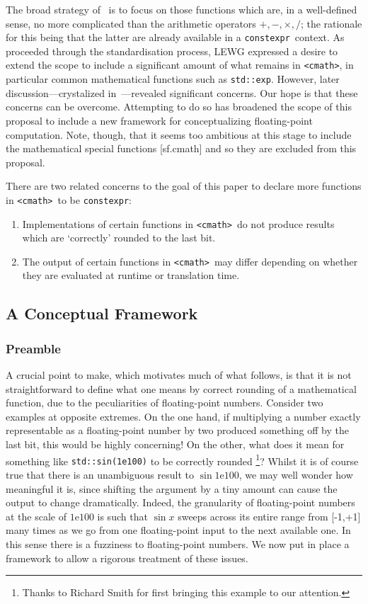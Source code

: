 \documentclass[prd,twocolumn,amsmath,amssymb,nofootinbib,eqsecnum]{revtex4-1}
\newcommand{\constexpr}{\code{constexpr}\xspace}
\newcommand{\code}[1]{{\tt #1}}
\newcommand{\header}[1]{{\tt <#1>}}
\newcommand{\cmath}{\header{cmath}}
\newcommand{\Operators}{\ensuremath{+,-,\times,/}}
\begin{document}
The broad strategy of~\cite{Rosten-constexpr} is to focus on those functions which are, in a well-defined sense, no more complicated than the arithmetic operators \Operators; the rationale for this being that the latter are already available in a \constexpr\ context.
As~\cite{Rosten-constexpr} proceeded through the standardisation process, LEWG expressed a desire 
to extend the scope to include a significant amount of what remains in \cmath, in particular common mathematical functions such as \code{std::exp}. However, later discussion---crystalized in~\cite{Timmons-Less}---revealed significant concerns. Our hope is that these concerns can be overcome. Attempting to do so has broadened the scope of this proposal to include a new framework for conceptualizing floating-point computation.
Note, though, that it seems too ambitious at this stage to include the mathematical special functions [sf.cmath] and so they are excluded from this proposal.

There are two related concerns to the goal of this paper to declare more functions in \cmath\ to be \constexpr:
\begin{enumerate}
	\item Implementations of certain functions in \cmath\ do not produce results which are `correctly' rounded to the last bit.
	
	\item The output of certain functions in \cmath\ may differ depending on whether they are evaluated at runtime or translation time.
\end{enumerate}

\subsection{A Conceptual Framework}

\subsubsection{Preamble}

A crucial point to make, which motivates much of what follows, is that it is not straightforward to define what one means by correct rounding of a mathematical function, due to the peculiarities of floating-point numbers. Consider two examples at opposite extremes. On the one hand, if multiplying a number exactly representable as a floating-point number by two produced something off by the last bit, this would be highly concerning! On the other, what does it mean for something like \code{std::sin(1e100)} to be correctly rounded%
\footnote{Thanks to Richard Smith for first bringing this example to our attention.}? Whilst it is of course true that there is an unambiguous result to $\sin 1\mathrm{e}100$, we may well wonder how meaningful it is, since shifting the argument by a tiny amount can cause the output to change dramatically. Indeed, the granularity of floating-point numbers at the scale of $1\mathrm{e}100$ is such that $\sin x$ sweeps across its entire range from [-1,+1] many times as we go from one floating-point input to the next available one. In this sense there is a fuzziness to floating-point numbers. We now put in place a framework to allow a rigorous treatment of these issues.
\end{document}
